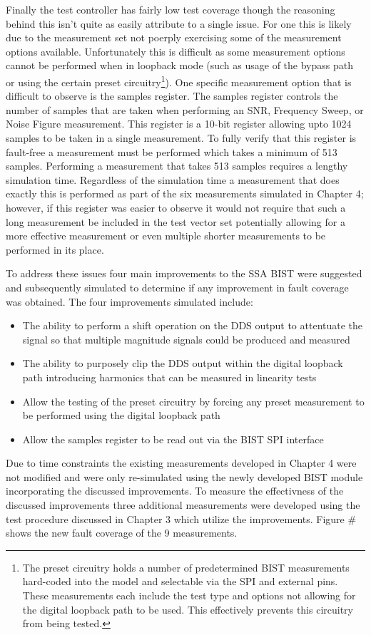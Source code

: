 \documentclass[12pt]{report}
\begin{document}
Finally the test controller has fairly low test coverage though the reasoning behind this isn't quite as easily attribute to a single issue.  For one this is likely due to the measurement set not poerply exercising some of the measurement options available.  Unfortunately this is difficult as some measurement options cannot be performed when in loopback mode (such as usage of the bypass path or using the certain preset circuitry\footnote{The preset circuitry holds a number of predetermined BIST measurements hard-coded into the model and selectable via the SPI and external pins.  These measurements each include the test type and options not allowing for the digital loopback path to be used.  This effectively prevents this circuitry from being tested.}).  One specific measurement option that is difficult to observe is the samples register.  The samples register controls the number of samples that are taken when performing an SNR, Frequency Sweep, or Noise Figure measurement.  This register is a 10-bit register allowing upto 1024 samples to be taken in a single measurement.  To fully verify that this register is fault-free a measurement must be performed which takes a minimum of 513 samples.  Performing a measurement that takes 513 samples requires a lengthy simulation time.  Regardless of the simulation time a measurement that does exactly this is performed as part of the six measurements simulated in Chapter 4; however, if this register was easier to observe it would not require that such a long measurement be included in the test vector set potentially allowing for a more effective measurement or even multiple shorter measurements to be performed in its place.

To address these issues four main improvements to the SSA BIST were suggested and subsequently simulated to determine if any improvement in fault coverage was obtained.  The four improvements simulated include:
\begin{itemize}
  \item The ability to perform a shift operation on the DDS output to attentuate the signal so that multiple magnitude signals could be produced and measured
  \item The ability to purposely clip the DDS output within the digital loopback path introducing harmonics that can be measured in linearity tests
  \item Allow the testing of the preset circuitry by forcing any preset measurement to be performed using the digital loopback path
  \item Allow the samples register to be read out via the BIST SPI interface 
\end{itemize}
Due to time constraints the existing measurements developed in Chapter 4 were not modified and were only re-simulated using the newly developed BIST module incorporating the discussed improvements.  To measure the effectivness of the discussed improvements three additional measurements were developed using the test procedure discussed in Chapter 3 which utilize the improvements.  Figure # shows the new fault coverage of the 9 measurements.
\end{document}
